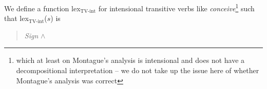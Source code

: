We define a function lex$_{\mathrm{TV}\textrm{-}\mathrm{int}}$ for intensional transitive verbs like
\textit{conceive}\footnote{which at least on Montague's analysis is
  intensional and does not have a decompositional interpretation -- we
  do not take up the issue here of whether Montague's analysis was correct} such that
lex$_{\mathrm{TV}\textrm{-}\mathrm{int}}$($s$) is
\begin{quote}
\hspace*{-4em}\textit{Sign} \d{$\wedge$} \\
\hspace*{-4em}

\end{quote} 

